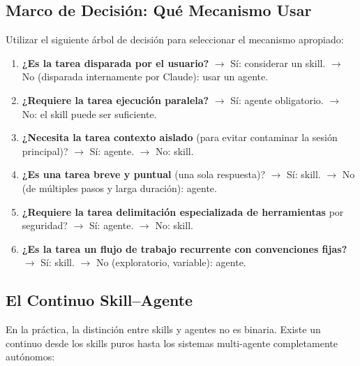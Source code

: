 \documentclass[11pt,letterpaper]{article}
\begin{document}
\subsection{Marco de Decisión: Qué Mecanismo Usar}

Utilizar el siguiente árbol de decisión para seleccionar el mecanismo apropiado:

\begin{enumerate}[leftmargin=*]
    \item \textbf{¿Es la tarea disparada por el usuario?} $\rightarrow$ Sí: considerar un skill. $\rightarrow$ No (disparada internamente por Claude): usar un agente.
    \item \textbf{¿Requiere la tarea ejecución paralela?} $\rightarrow$ Sí: agente obligatorio. $\rightarrow$ No: el skill puede ser suficiente.
    \item \textbf{¿Necesita la tarea contexto aislado} (para evitar contaminar la sesión principal)? $\rightarrow$ Sí: agente. $\rightarrow$ No: skill.
    \item \textbf{¿Es una tarea breve y puntual} (una sola respuesta)? $\rightarrow$ Sí: skill. $\rightarrow$ No (de múltiples pasos y larga duración): agente.
    \item \textbf{¿Requiere la tarea delimitación especializada de herramientas} por seguridad? $\rightarrow$ Sí: agente. $\rightarrow$ No: skill.
    \item \textbf{¿Es la tarea un flujo de trabajo recurrente con convenciones fijas?} $\rightarrow$ Sí: skill. $\rightarrow$ No (exploratorio, variable): agente.
\end{enumerate}

\subsection{El Continuo Skill--Agente}

En la práctica, la distinción entre skills y agentes no es binaria. Existe un continuo desde los skills puros hasta los sistemas multi-agente completamente autónomos:
\end{document}
